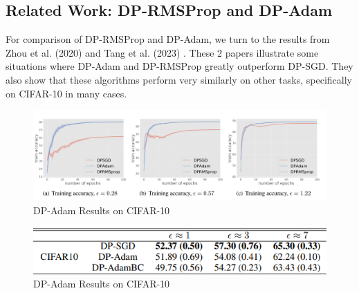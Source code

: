 \subsection{Related Work: DP-RMSProp and DP-Adam}\label{subsec:related-work-RMSProp}
For comparison of DP-RMSProp and DP-Adam, we turn to the results from Zhou et al. (2020) \cite{zhou_2020_private_adaptive_algorithms} and Tang et al. (2023) \cite{tang2023dpadambcdpadamactuallydpsgd}.
These 2 papers illustrate some situations where DP-Adam and DP-RMSProp greatly outperform DP-SGD. They also show that these algorithms perform
very similarly on other tasks, specifically on CIFAR-10 in many cases.

\begin{figure}[ht]
    \centering
    \includegraphics[width=\textwidth]{zhou.PNG}
    \caption{DP-Adam Results on CIFAR-10 \cite{tang2023dpadambcdpadamactuallydpsgd}}
    \label{fig:image_label}
\end{figure}

\begin{figure}[ht]
    \centering
    \includegraphics[width=\textwidth]{dp-adam-rms-results.PNG}
    \caption{DP-Adam Results on CIFAR-10 \cite{tang2023dpadambcdpadamactuallydpsgd}}
    \label{fig:image_label}
\end{figure}